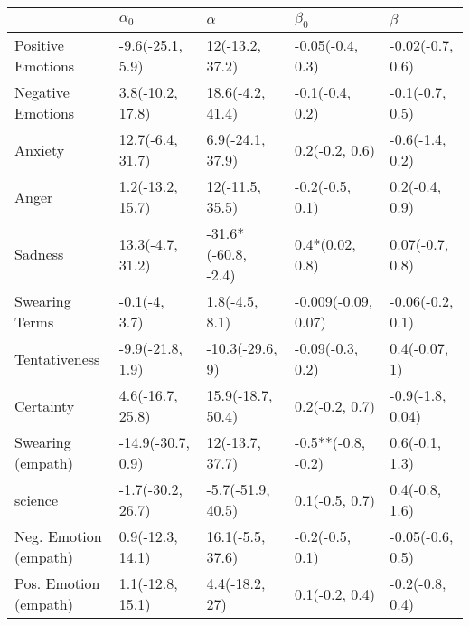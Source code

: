 \begin{tabular}{lllll}
\toprule
{} &         $\alpha_0$ &             $\alpha$ &            $\beta_0$ &           $\beta$ \\
\midrule
Positive Emotions     &   -9.6(-25.1, 5.9) &      12(-13.2, 37.2) &     -0.05(-0.4, 0.3) &  -0.02(-0.7, 0.6) \\
Negative Emotions     &   3.8(-10.2, 17.8) &     18.6(-4.2, 41.4) &      -0.1(-0.4, 0.2) &   -0.1(-0.7, 0.5) \\
Anxiety               &   12.7(-6.4, 31.7) &     6.9(-24.1, 37.9) &       0.2(-0.2, 0.6) &   -0.6(-1.4, 0.2) \\
Anger                 &   1.2(-13.2, 15.7) &      12(-11.5, 35.5) &      -0.2(-0.5, 0.1) &    0.2(-0.4, 0.9) \\
Sadness               &   13.3(-4.7, 31.2) &  -31.6*(-60.8, -2.4) &      0.4*(0.02, 0.8) &   0.07(-0.7, 0.8) \\
Swearing Terms        &      -0.1(-4, 3.7) &       1.8(-4.5, 8.1) &  -0.009(-0.09, 0.07) &  -0.06(-0.2, 0.1) \\
Tentativeness         &   -9.9(-21.8, 1.9) &      -10.3(-29.6, 9) &     -0.09(-0.3, 0.2) &     0.4(-0.07, 1) \\
Certainty             &   4.6(-16.7, 25.8) &    15.9(-18.7, 50.4) &       0.2(-0.2, 0.7) &  -0.9(-1.8, 0.04) \\
Swearing (empath)     &  -14.9(-30.7, 0.9) &      12(-13.7, 37.7) &   -0.5**(-0.8, -0.2) &    0.6(-0.1, 1.3) \\
science               &  -1.7(-30.2, 26.7) &    -5.7(-51.9, 40.5) &       0.1(-0.5, 0.7) &    0.4(-0.8, 1.6) \\
Neg. Emotion (empath) &   0.9(-12.3, 14.1) &     16.1(-5.5, 37.6) &      -0.2(-0.5, 0.1) &  -0.05(-0.6, 0.5) \\
Pos. Emotion (empath) &   1.1(-12.8, 15.1) &       4.4(-18.2, 27) &       0.1(-0.2, 0.4) &   -0.2(-0.8, 0.4) \\
\bottomrule
\end{tabular}
